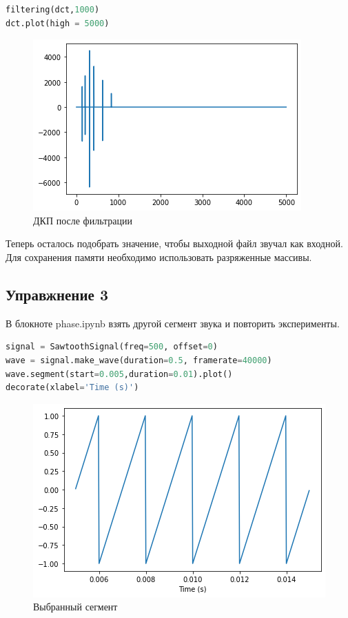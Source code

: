 \begin{lstlisting}[language=Python]
filtering(dct,1000)
dct.plot(high = 5000)
\end{lstlisting}
\begin{figure}[H]
	\begin{center}
		\includegraphics[scale=1]{fig/lab06/lab06_32_0.png}
		\caption{ДКП после фильтрации}
	\end{center}
\end{figure}

Теперь осталось подобрать значение, чтобы выходной файл звучал как входной. Для сохранения памяти необходимо использовать разряженные массивы.

\subsection{Управжнение 3}

В блокноте phase.ipynb взять другой сегмент звука и повторить эксперименты.

\begin{lstlisting}[language=Python]
signal = SawtoothSignal(freq=500, offset=0)
wave = signal.make_wave(duration=0.5, framerate=40000)
wave.segment(start=0.005,duration=0.01).plot()
decorate(xlabel='Time (s)')
\end{lstlisting}
\begin{figure}[H]
	\begin{center}
		\includegraphics[scale=1]{fig/lab06/lab06_41_0.png}
		\caption{Выбранный сегмент}
	\end{center}
\end{figure}

